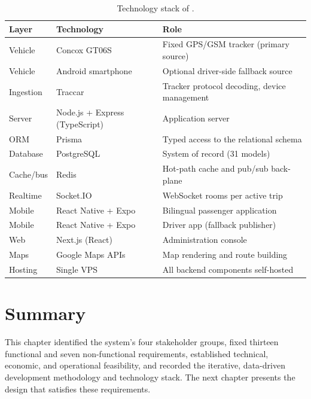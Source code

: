 \begin{table}[H]
\caption{Technology stack of \system{}.}
\label{tab:stack}
\centering
\small
\begin{tabular}{@{}lll@{}}
\toprule
\textbf{Layer} & \textbf{Technology} & \textbf{Role} \\
\midrule
Vehicle & Concox GT06S & Fixed GPS/GSM tracker (primary source) \\
Vehicle & Android smartphone & Optional driver-side fallback source \\
Ingestion & Traccar & Tracker protocol decoding, device management \\
Server & Node.js + Express (TypeScript) & Application server \\
ORM & Prisma & Typed access to the relational schema \\
Database & PostgreSQL & System of record (31 models) \\
Cache/bus & Redis & Hot-path cache and pub/sub back-plane \\
Realtime & Socket.IO & WebSocket rooms per active trip \\
Mobile & React Native + Expo & Bilingual passenger application \\
Mobile & React Native + Expo & Driver app (fallback publisher) \\
Web & Next.js (React) & Administration console \\
Maps & Google Maps APIs & Map rendering and route building \\
Hosting & Single VPS & All backend components self-hosted \\
\bottomrule
\end{tabular}
\end{table}

\section{Summary}
This chapter identified the system's four stakeholder groups, fixed
thirteen functional and seven non-functional requirements, established
technical, economic, and operational feasibility, and recorded the
iterative, data-driven development methodology and technology stack. The
next chapter presents the design that satisfies these requirements.
